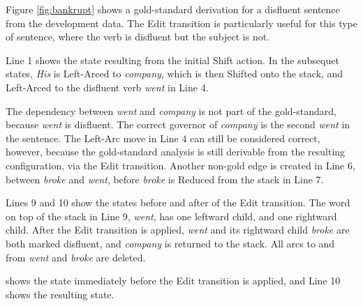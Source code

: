 \documentclass[11pt,letterpaper]{article}
\begin{document}
Figure \ref{fig:bankrupt} shows a gold-standard derivation for a disfluent sentence
from the development data.  The Edit transition is particularly useful for this
type of sentence, where the verb is disfluent but the subject is not.

Line 1 shows the state resulting from the initial Shift action.  In the subsequet
states, \emph{His} is Left-Arced to \emph{company}, which is then Shifted onto
the stack, and Left-Arced to the disfluent verb \emph{went} in Line 4.

The dependency between \emph{went} and \emph{company} is not part of the gold-standard,
because \emph{went} is disfluent.  The correct governor of \emph{company} is the
second \emph{went} in the sentence.  The Left-Arc move in Line 4 can still
be considered correct, however, because the gold-standard analysis is still
derivable from the resulting configuration, via the Edit transition.
Another non-gold edge is created in Line 6, between \emph{broke} and \emph{went},
before \emph{broke} is Reduced from the stack in Line 7.

Lines 9 and 10 show the states before and after of the Edit transition. The word
on top of the stack in Line 9, \emph{went}, has one leftward child, and one
rightward child.  After the Edit transition is applied, \emph{went} and its 
rightward child \emph{broke} are both marked disfluent, and \emph{company}
is returned to the stack.  All arcs to and from \emph{went} and \emph{broke}
are deleted.

shows the state immediately before the Edit transition is applied, and Line
10 shows the resulting state.
\end{document}
